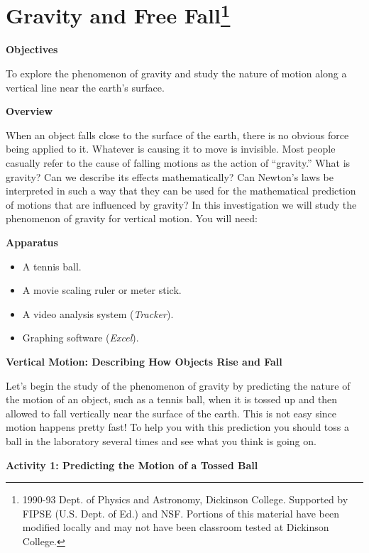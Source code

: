 
\section{Gravity and Free Fall\footnote{
1990-93 Dept. of Physics and Astronomy, Dickinson College. Supported by FIPSE
(U.S. Dept. of Ed.) and NSF. Portions of this material have been modified locally
and may not have been classroom tested at Dickinson College.
}}

\makelabheader %

\textbf{Objectives }

To explore the phenomenon of gravity and study the nature of motion along a
vertical line near the earth's surface.

\textbf{Overview }

When an object falls close to the surface of the earth, there is no obvious
force being applied to it. Whatever is causing it to move is invisible. Most
people casually refer to the cause of falling motions as the action of 
``gravity.''
What is gravity? Can we describe its effects mathematically? Can Newton's laws
be interpreted in such a way that they can be used for the mathematical prediction
of motions that are influenced by gravity? In this investigation we will study
the phenomenon of gravity for vertical motion. You will need:

\textbf{Apparatus}

\begin{itemize}
\item A tennis ball. 
\item A movie scaling ruler or meter stick.
\item A video analysis system (\textit{Tracker}). 
\item Graphing software (\textit{Excel}).
\end{itemize}
\textbf{Vertical Motion: Describing How Objects Rise and Fall }

Let's begin the study of the phenomenon of gravity by predicting the nature
of the motion of an object, such as a tennis ball, when it is tossed up and
then allowed to fall vertically near the surface of the earth. This is not easy
since motion happens pretty fast! To help you with this prediction you should
toss a ball in the laboratory several times and see what you think is going
on.

\textbf{Activity 1: Predicting the Motion of a Tossed Ball }

